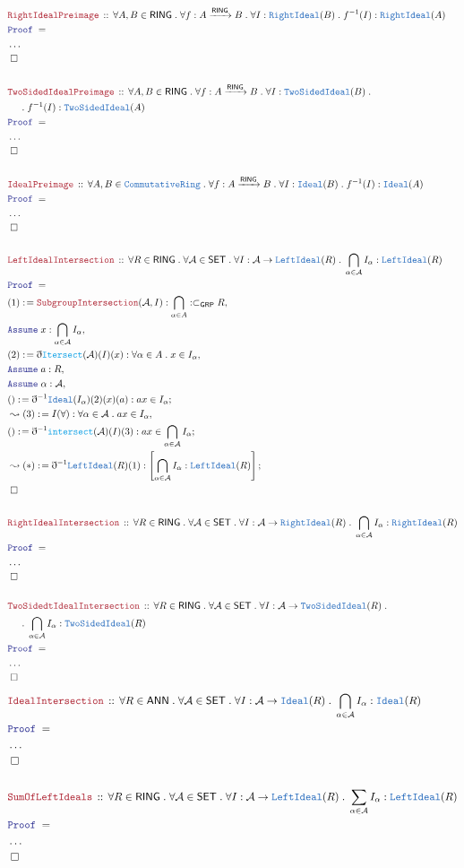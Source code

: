 \documentclass[12pt]{scrartcl}
\newcommand{\TYPE}[1]{\textcolor{NavyBlue}{\mathtt{#1}}}
\newcommand{\FUNC}[1]{\textcolor{Cerulean}{\mathtt{#1}}}
\newcommand{\LOGIC}[1]{\textcolor{Blue}{\mathtt{#1}}}
\newcommand{\THM}[1]{\textcolor{Maroon}{\mathtt{#1}}}
\renewcommand{\.}{\; . \;}
\newcommand{\de}{: \kern 0.1pc =}
\newcommand{\Theorem}[2]{& \THM{#1} \, :: \, #2 \\ & \Proof = \\ }
\newcommand{\NewLine}{\\ & \kern 1pc}
\newcommand{\Page}[1]{ \begin{align*} #1 \end{align*}   }
\newcommand{ \bd }{ \ByDef }
\newcommand{\NoProof}{ & \ldots \\ \EndProof}
\newcommand{\Say}[3]{& #1 \de #2 : #3, \\}
\newcommand{\Conclude}[3]{& #1 \de #2 : #3; \\}
\newcommand{\Derive}[3]{& \leadsto #1 \de #2 : #3, \\}
\newcommand{\DeriveConclude}[3]{& \leadsto #1 \de #2 : #3 ; \\}
\newcommand{\Assume}[2]{& \LOGIC{Assume} \; #1 : #2, \\}
\newcommand{\QED}{\; \square}
\newcommand{\EndProof}{& \QED \\}
\newcommand{\ByDef}{\eth}
\newcommand{\Proof}{\LOGIC{Proof} \; }
\newcommand{\Arrow}[1]{\xrightarrow{#1}}
\newcommand{\SET}{\mathsf{SET}}
\newcommand{\Sgrp}{\subset_{\mathsf{GRP}}}
\newcommand{\CR}{\TYPE{CommutativeRing}}
\newcommand{\RING}{\mathsf{RING}}
\newcommand{\ANN}{\mathsf{ANN}}
\begin{document}
\Page{		
	\Theorem{RightIdealPreimage}{ \forall A,B \in \RING \.  \forall f : A \Arrow{\RING} B \.  \forall I : \TYPE{RightIdeal}(B) \. f^{-1}(I) : \TYPE{RightIdeal}(A)}
	\NoProof
	\\
	\Theorem{TwoSidedIdealPreimage}{ \forall A,B \in \RING \.  \forall f : A \Arrow{\RING} B \.  \forall I : \TYPE{TwoSidedIdeal}(B) \.  \NewLine \. f^{-1}(I) : \TYPE{TwoSidedIdeal}(A)}
	\NoProof
	\\
	\Theorem{IdealPreimage}{ \forall A,B \in \CR \.  \forall f : A \Arrow{\RING} B \.  \forall I : \TYPE{Ideal}(B) \. f^{-1}(I) : \TYPE{Ideal}(A)}
	\NoProof
	\\
	\Theorem{LeftIdealIntersection}{\forall R \in \RING \. \forall \mathcal{A} \in \SET \. \forall I : \mathcal{A} \to \TYPE{LeftIdeal}(R) \. \bigcap_{\alpha \in \mathcal{A}} I_{\alpha} : \TYPE{LeftIdeal}(R) }
	\Say{(1)}{ \THM{SubgroupIntersection}(\mathcal{A},I) }{ \bigcap_{\alpha \in A} : \Sgrp R   }
	\Assume{x}{\bigcap_{\alpha \in \mathcal{A}} I_{\alpha}}
	\Say{(2)}{\bd \FUNC{Itersect}(\mathcal{A})(I)(x)}{\forall \alpha \in A \. x \in I_{\alpha}}
	\Assume{a}{R}
	\Assume{\alpha}{\mathcal{A}}
	\Conclude{()}{\bd^{-1} \TYPE{Ideal}(I_\alpha)(2)(x)(a)}{ax \in I_{\alpha}}
	\Derive{(3)}{I(\forall)}{\forall \alpha \in \mathcal{A} \. ax \in I_{\alpha}}
	\Conclude{()}{\bd^{-1} \FUNC{intersect}(\mathcal{A})(I)(3)}{ax \in \bigcap_{\alpha \in \mathcal{A}} I_\alpha}
	\DeriveConclude{(*)}{\bd^{-1} \TYPE{LeftIdeal}(R)(1)}{  \left[ \bigcap_{\alpha \in \mathcal{A}} I_\alpha : \TYPE{LeftIdeal}(R)  \right]    }
	\EndProof
	\\
	\Theorem{RightIdealIntersection}{\forall R \in \RING \. \forall \mathcal{A} \in \SET \. \forall I : \mathcal{A} \to \TYPE{RightIdeal}(R) \. \bigcap_{\alpha \in \mathcal{A}} I_{\alpha} : \TYPE{RightIdeal}(R) }
	\NoProof
	\\
	\Theorem{TwoSidedtIdealIntersection}{\forall R \in \RING \. \forall \mathcal{A} \in \SET \. \forall I : \mathcal{A} \to \TYPE{TwoSidedIdeal}(R) \. 
		\NewLine \. \bigcap_{\alpha \in \mathcal{A}} I_{\alpha} : \TYPE{TwoSidedIdeal}(R) }
	\NoProof
}\Page{
	\Theorem{IdealIntersection}{\forall R \in \ANN \. \forall \mathcal{A} \in \SET \. \forall I : \mathcal{A} \to \TYPE{Ideal}(R) \. \bigcap_{\alpha \in \mathcal{A}} I_{\alpha} : \TYPE{Ideal}(R) }
	\NoProof
	\\
	\Theorem{SumOfLeftIdeals}{ \forall R \in \RING \. \forall \mathcal{A} \in \SET \. \forall I : \mathcal{A} \to \TYPE{LeftIdeal}(R) \. \sum_{\alpha \in \mathcal{A}} I_{\alpha} : \TYPE{LeftIdeal}(R)}
	\NoProof
	\\
}
\end{document}
